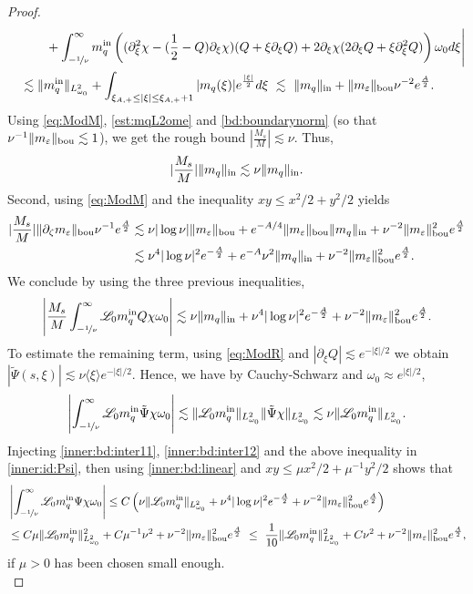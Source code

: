 \documentclass[11pt]{aims}
\theoremstyle{definition}
\newcommand{\Ls}{\mathscr{L}}
\newcommand{\pa}{\partial}
\newcommand{\inn}{\textup{in}}
\newcommand{\bd}{\textup{bou}}
\newcommand{\be}{\begin{equation}}
\newcommand{\ee}{\end{equation}}
\newcommand{\intb}{\int_{-\nicefrac{1}{\nu}}^\infty}
\numberwithin{equation}{section}
\begin{document}
\begin{proof}
\begin{align*}
&\quad  \qquad + \int_{-\nicefrac{1}{\nu}}^\infty m_q^\inn \left((\pa_\xi^2\chi-(\frac 12 -Q)\pa_\xi \chi)(Q+\xi\pa_\xi Q) +2\pa_\xi \chi (2\pa_\xi Q+\xi\pa_\xi^2 Q)\right)\omega_0 d\xi \Biggr|\\
&\quad \lesssim  \|m_q^\inn \|_{L^2_{\omega_0}}+\int_{\xi_{A,+}\leq |\xi| \leq \xi_{A,+}+1} |m_q(\xi)|e^{\frac{|\xi|}{2}} d\xi \ \lesssim \  \|m_q\|_\inn + \| m_\varepsilon \|_{\bd} \nu^{-2}e^{\frac A2}. 
\end{align*}
Using \eqref{eq:ModM}, \eqref{est:mqL2ome} and \eqref{bd:boundarynorm} (so that $\nu^{-1}\|  m_\varepsilon \|_{\bd} \lesssim 1 $), we get the rough bound $ |\frac{M_s}{M}|\lesssim \nu $. Thus, 
$$
|\frac{M_s}{M}| \|m_q\|_\inn \lesssim \nu  \|m_q\|_\inn.
$$
Second, using \eqref{eq:ModM} and the inequality $xy\leq x^2/2+y^2/2$ yields
\begin{align*}
 |\frac{M_s}{M}| \| \pa_\zeta m_\varepsilon \|_{\bd} \nu^{-1}e^{\frac A2} & \lesssim \nu |\log \nu|\|  m_\varepsilon \|_{\bd}+e^{-A/4} \|  m_\varepsilon \|_{\bd} \| m_q\|_{\inn}+\nu^{-2} \|  m_\varepsilon \|_{\bd}^2 e^{\frac A2} \\
& \lesssim \nu^4 |\log \nu|^2 e^{-\frac A2}+e^{-A}\nu^2  \| m_q\|_{\inn}+\nu^{-2} \|  m_\varepsilon \|_{\bd}^2 e^{\frac A2} .
\end{align*}
We conclude by using the three previous inequalities,
\be \label{inner:bd:inter12}
 \left| \frac{M_s}{M} \intb  \Ls_0 m_q^\inn Q \chi \omega_0 \right|  \lesssim \nu \|m_q\|_\inn + \nu^4 |\log \nu|^2 e^{-\frac A2}+\nu^{-2} \|  m_\varepsilon \|_{\bd}^2 e^{\frac A2}.
 \ee
To estimate the remaining term, using \eqref{eq:ModR} and $|\pa_\xi Q|\lesssim e^{-|\xi|/2}$ we obtain $|\tilde \Psi (s,\xi)|\lesssim \nu \langle \xi \rangle e^{-|\xi|/2}$. Hence, we have by Cauchy-Schwarz and $\omega_0\approx e^{|\xi|/2}$,
$$
\left| \intb \Ls_0 m_q^\inn \tilde \Psi \chi \omega_0 \right| \lesssim \| \Ls_0 m_q^\inn \|_{L^2_{\omega_0}} \| \tilde \Psi \chi \|_{L^2_{\omega_0}}\lesssim \nu  \| \Ls_0 m_q^\inn \|_{L^2_{\omega_0}}.
$$
Injecting \eqref{inner:bd:inter11}, \eqref{inner:bd:inter12} and the above inequality in \eqref{inner:id:Psi}, then using \eqref{inner:bd:linear} and $xy\leq \mu x^2/2+\mu^{-1} y^2/2$ shows that
\begin{align}
 \label{inner:bd:interPsi}  & \left|  \intb  \Ls_0 m_q^\inn \Psi \chi \omega_0 \right|\leq C\left(  \nu  \| \Ls_0 m_q^\inn \|_{L^2_{\omega_0}}+ \nu^4 |\log \nu|^2 e^{-\frac A2}+\nu^{-2} \|  m_\varepsilon \|_{\bd}^2 e^{\frac A2} \right)\\
\nonumber & \leq  C\mu \| \Ls_0 m_q^\inn \|_{L^2_{\omega_0}}^2+C\mu^{-1}\nu^2+\nu^{-2} \|  m_\varepsilon \|_{\bd}^2 e^{\frac A2}  \ \leq \ \frac{1}{10} \| \Ls_0 m_q^\inn \|_{L^2_{\omega_0}}^2+C \nu^2+\nu^{-2} \|  m_\varepsilon \|_{\bd}^2 e^{\frac A2},
\end{align}
if $\mu>0$ has been chosen small enough.\\


\end{proof}
\end{document}

